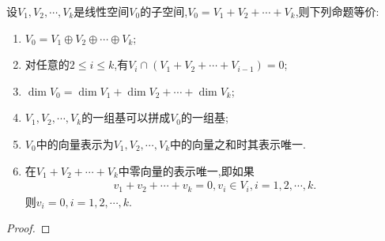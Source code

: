\documentclass[../../main.tex]{subfiles}
\begin{document}
\begin{theorem}[直和的等价条件]\label{theorem:直和的等价条件}
设\(V_1,V_2,\cdots,V_k\)是线性空间\(V_0\)的子空间,\(V_0 = V_1 + V_2+\cdots+V_k\),则下列命题等价:
\begin{enumerate}[(1)]
\item \label{theorem:直和的等价条件1}\(V_0 = V_1\oplus V_2\oplus\cdots\oplus V_k\);
\item \label{theorem:直和的等价条件2}对任意的\(2\leqslant  i\leqslant  k\),有\(V_i\cap(V_1 + V_2+\cdots+V_{i - 1}) = 0\);
\item \label{theorem:直和的等价条件3}\(\dim V_0=\dim V_1+\dim V_2+\cdots+\dim V_k\);
\item \label{theorem:直和的等价条件4}\(V_1,V_2,\cdots,V_k\)的一组基可以拼成\(V_0\)的一组基;
\item \label{theorem:直和的等价条件5}\(V_0\)中的向量表示为\(V_1,V_2,\cdots,V_k\)中的向量之和时其表示唯一.
\item \label{theorem:直和的等价条件6}在$ V_1 + V_2+\cdots+V_k$中零向量的表示唯一,即如果
\begin{align*}
v_1+v_2+\cdots+v_k=0,v_i\in V_i,i=1,2,\cdots,k.
\end{align*}
则$v_i=0,i=1,2,\cdots,k.$
\end{enumerate}
\end{theorem}
\begin{proof}

\end{proof}
\end{document}
